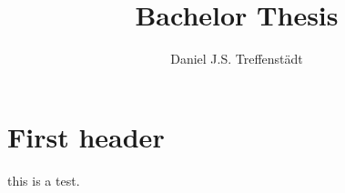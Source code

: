 \documentclass[abstract,toc,english]{jluthesis}
\title[Thesis]{Bachelor Thesis}
\author[Daniel Treffenstädt]{Daniel J.S. Treffenstädt}
\begin{document}

\section{First header}
this is a test.

\backmatter
\end{document}

